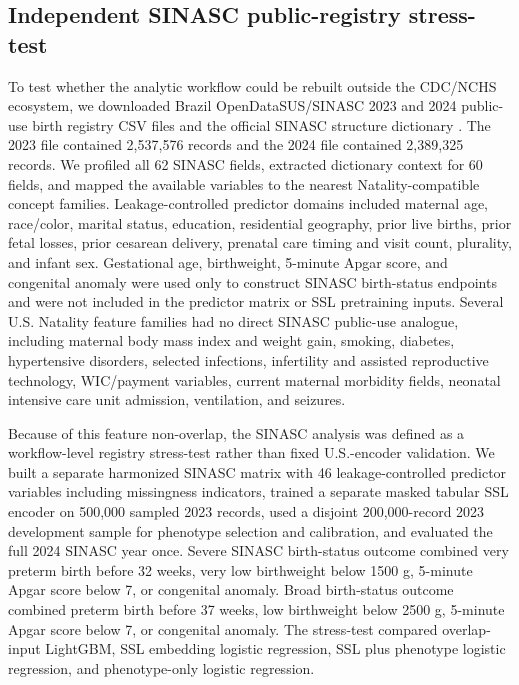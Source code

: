 \documentclass[pdflatex,sn-vancouver-num]{sn-jnl}
\begin{document}
\subsection{Independent SINASC public-registry stress-test}\label{subsec:sinasc}

To test whether the analytic workflow could be rebuilt outside the CDC/NCHS ecosystem, we downloaded Brazil OpenDataSUS/SINASC 2023 and 2024 public-use birth registry CSV files and the official SINASC structure dictionary \cite{opendatasus_sinasc,sinasc_structure_dictionary}. The 2023 file contained 2,537,576 records and the 2024 file contained 2,389,325 records. We profiled all 62 SINASC fields, extracted dictionary context for 60 fields, and mapped the available variables to the nearest Natality-compatible concept families. Leakage-controlled predictor domains included maternal age, race/color, marital status, education, residential geography, prior live births, prior fetal losses, prior cesarean delivery, prenatal care timing and visit count, plurality, and infant sex. Gestational age, birthweight, 5-minute Apgar score, and congenital anomaly were used only to construct SINASC birth-status endpoints and were not included in the predictor matrix or SSL pretraining inputs. Several U.S. Natality feature families had no direct SINASC public-use analogue, including maternal body mass index and weight gain, smoking, diabetes, hypertensive disorders, selected infections, infertility and assisted reproductive technology, WIC/payment variables, current maternal morbidity fields, neonatal intensive care unit admission, ventilation, and seizures.

Because of this feature non-overlap, the SINASC analysis was defined as a workflow-level registry stress-test rather than fixed U.S.-encoder validation. We built a separate harmonized SINASC matrix with 46 leakage-controlled predictor variables including missingness indicators, trained a separate masked tabular SSL encoder on 500,000 sampled 2023 records, used a disjoint 200,000-record 2023 development sample for phenotype selection and calibration, and evaluated the full 2024 SINASC year once. Severe SINASC birth-status outcome combined very preterm birth before 32 weeks, very low birthweight below 1500 g, 5-minute Apgar score below 7, or congenital anomaly. Broad birth-status outcome combined preterm birth before 37 weeks, low birthweight below 2500 g, 5-minute Apgar score below 7, or congenital anomaly. The stress-test compared overlap-input LightGBM, SSL embedding logistic regression, SSL plus phenotype logistic regression, and phenotype-only logistic regression.
\end{document}
